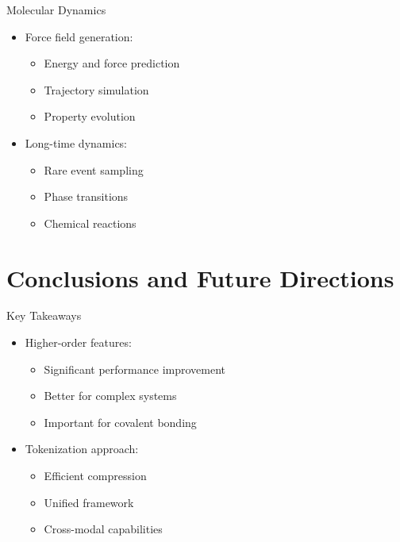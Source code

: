 \begin{frame}{Molecular Dynamics}
    \begin{itemize}
        \item Force field generation:
        \begin{itemize}
            \item Energy and force prediction
            \item Trajectory simulation
            \item Property evolution
        \end{itemize}
        \item Long-time dynamics:
        \begin{itemize}
            \item Rare event sampling
            \item Phase transitions
            \item Chemical reactions
        \end{itemize}
    \end{itemize}
\end{frame}

\section{Conclusions and Future Directions}

\begin{frame}{Key Takeaways}
    \begin{itemize}
        \item Higher-order features:
        \begin{itemize}
            \item Significant performance improvement
            \item Better for complex systems
            \item Important for covalent bonding
        \end{itemize}
        \item Tokenization approach:
        \begin{itemize}
            \item Efficient compression
            \item Unified framework
            \item Cross-modal capabilities
        \end{itemize}
    \end{itemize}
\end{frame}

